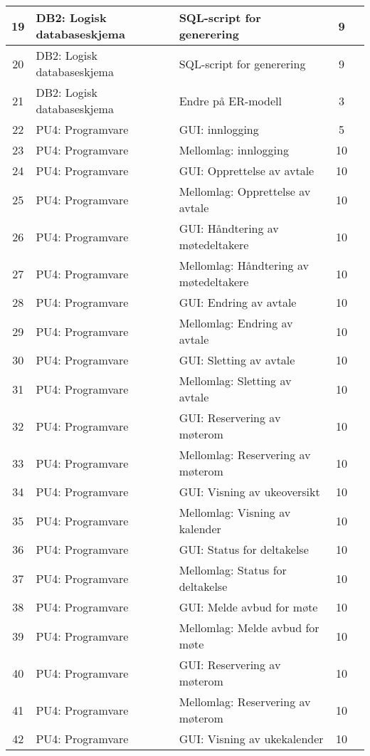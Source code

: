 \begin{table}
{\begin{tabularx}{1.3\textwidth}{|c|l|X|c|c|}
	19 & DB2: Logisk databaseskjema & SQL-script for generering & 9 & \\ \hline
	20 & DB2: Logisk databaseskjema & SQL-script for generering & 9 & \\ \hline
	21 & DB2: Logisk databaseskjema & Endre på ER-modell & 3 & \\ \hline
	22 & PU4: Programvare & GUI: innlogging & 5 & \\ \hline
	23 & PU4: Programvare & Mellomlag: innlogging & 10 & \\ \hline
	24 & PU4: Programvare & GUI: Opprettelse av avtale & 10 & \\ \hline
	25 & PU4: Programvare & Mellomlag: Opprettelse av avtale & 10 & \\ \hline
	26 & PU4: Programvare & GUI: Håndtering av møtedeltakere & 10 & \\ \hline
	27 & PU4: Programvare & Mellomlag: Håndtering av møtedeltakere & 10 & \\ \hline
	28 & PU4: Programvare & GUI: Endring av avtale & 10 & \\  \hline
	29 & PU4: Programvare & Mellomlag: Endring av avtale & 10 & \\ \hline
	30 & PU4: Programvare & GUI: Sletting av avtale & 10 & \\ \hline
	31 & PU4: Programvare & Mellomlag: Sletting av avtale & 10 & \\ \hline
	32 & PU4: Programvare & GUI: Reservering av møterom & 10 & \\ \hline
	33 & PU4: Programvare & Mellomlag: Reservering av møterom & 10 & \\ \hline
	34 & PU4: Programvare & GUI: Visning av ukeoversikt & 10 & \\ \hline
	35 & PU4: Programvare & Mellomlag: Visning av kalender  & 10 & \\ \hline
	36 & PU4: Programvare & GUI: Status for deltakelse & 10 & \\ \hline
	37 & PU4: Programvare & Mellomlag: Status for deltakelse  & 10 & \\ \hline
	38 & PU4: Programvare & GUI: Melde avbud for møte & 10 & \\ \hline
	39 & PU4: Programvare & Mellomlag: Melde avbud for møte  & 10 & \\ \hline
	40 & PU4: Programvare & GUI: Reservering av møterom & 10 & \\ \hline
	41 & PU4: Programvare & Mellomlag: Reservering av møterom & 10 & \\ \hline
	42 & PU4: Programvare & GUI: Visning av ukekalender & 10 & \\ \hline

\end{tabularx}}
\end{table}
